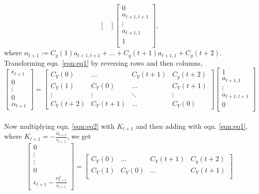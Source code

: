 \documentclass[11pt,english]{article}
\begin{document}
{\begin{equation}
\begin{bmatrix}
\end{bmatrix}
\begin{bmatrix}
0\\
a_{t+1,t+1}\\
\vdots\\
a_{t+1,1}\\
1\\
\end{bmatrix},
\end{equation}
where $\alpha_{t+1} := C_y(1)a_{t+1,t+1} + \ldots + C_y(t+1)a_{t+1,1} + C_y(t+2)$. Transforming eqn. \eqref{eqn:eq1} by reversing rows and then columns,
\begin{equation}\label{eqn:eq2}
\begin{bmatrix}
\epsilon_{t+1}\\
0\\
\vdots\\
0 \\
\alpha_{t+1}
\end{bmatrix} = 
\begin{bmatrix}
C_Y(0) &\ldots &C_Y(t+1) &C_y(t+2)\\
C_Y(1) &C_Y(0) &\ldots &C_Y(t+1)\\
\vdots &\vdots &\ddots &\vdots\\
C_Y(t+2) &C_Y(t+1) &\ldots &C_Y(0)
\end{bmatrix}
\begin{bmatrix}
1\\
a_{t+1,1}\\
\vdots\\
a_{t+1,t+1}\\
0\\
\end{bmatrix}
\end{equation}\\
Now multiplying eqn. \eqref{eqn:eq2} with $K_{t+1}$ and then adding with eqn. \eqref{eqn:eq1}, where $K_{t+1} = -\frac{\alpha_{t+1}}{\epsilon_{t+1}}$, we get
\begin{equation}\label{eqn:eq3}
\begin{bmatrix}
0 \\
\vdots\\
\vdots\\
0\\
\epsilon_{t+1}-\frac{\alpha_{t+1}^2}{\epsilon_{t+1}}
\end{bmatrix} = 
\begin{bmatrix}
C_Y(0) &\ldots &C_Y(t+1) &C_y(t+2)\\
C_Y(1) &C_Y(0) &\ldots &C_Y(t+1)\\

\end{bmatrix}
\end{equation}}
\end{document}

